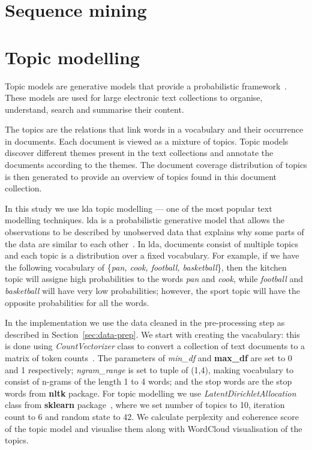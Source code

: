 \section{Sequence mining}

\section{Topic modelling}
Topic models are generative models that provide a probabilistic framework~\cite{topic-model}. These models are used for large electronic text collections to organise, understand, search and summarise their content. 

The topics are the relations that link words in a vocabulary and their occurrence in documents. Each document is viewed as a mixture of topics. Topic models discover different themes present in the text collections and annotate the documents according to the themes. The document coverage distribution of topics is then generated to provide an overview of topics found in this document collection. 

In this study we use \acrfull{lda} topic modelling --- one of the most popular text modelling techniques. \Acrshort{lda} is a probabilistic generative model that allows the observations to be described by unobserved data that explains why some parts of the data are similar to each other~\cite{tong-topic-modelling}. In \acrshort{lda}, documents consist of multiple topics and each topic is a distribution over a fixed vocabulary. For example, if we have the  following vocabulary of \{\textit{pan, cook, football, basketball}\}, then the kitchen topic will assigne high probabilities to the words \textit{pan} and \textit{cook}, while \textit{football} and \textit{basketball} will have very low probabilities; however, the sport topic will have the opposite probabilities for all the words. 

In the implementation we use the data cleaned in the pre-processing step as described in Section~\ref{sec:data-prep}. We start with creating the vacabulary: this is done using \textit{CountVectorizer} class to convert a collection of text documents to a matrix of token counts~\cite{scikitlearnCountVectorizer}. The parameters of \textit{min\_df} and \textbf{max\_df} are set to 0 and 1 respectively; \textit{ngram\_range} is set to tuple of (1,4), making vocabulary to consist of n-grams of the length 1 to 4 words; and the stop words are the stop words from \textbf{nltk} package. For topic modelling we use \textit{LatentDirichletAllocation} class from \textbf{sklearn} package~\cite{scikitlearnLatentDirichletAllocation}, where we set number of topics to 10, iteration count to 6 and random state to 42. We calculate perplexity and coherence score of the topic model and visualise them along with WordCloud visualisation of the topics. 


